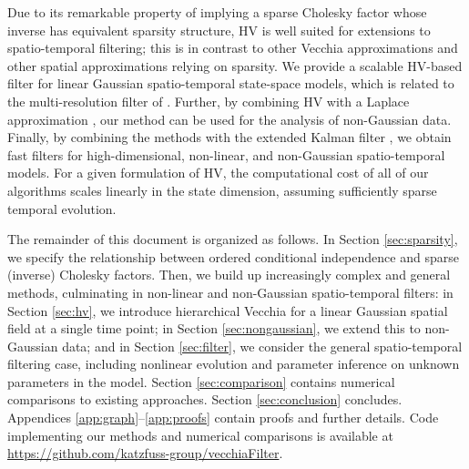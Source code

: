 \documentclass[12pt,letterpaper]{article}
\theoremstyle{propstyle}
\theoremstyle{propstyle}
\theoremstyle{propstyle}
\theoremstyle{propstyle}
\theoremstyle{propstyle}
\newcommand{\todo}[1]{\textcolor{red}{[#1]}}
\begin{document}
Due to its remarkable property of implying a sparse Cholesky factor whose inverse has equivalent sparsity structure, HV is well suited for extensions to spatio-temporal filtering; this is in contrast to other Vecchia approximations and other spatial approximations relying on sparsity. We provide a scalable HV-based filter for linear Gaussian spatio-temporal state-space models, which is related to the multi-resolution filter of \citet{Jurek2018}.
Further, by combining HV with a Laplace approximation \citep[cf.][]{Zilber2019}, our method can be used for the analysis of non-Gaussian data. Finally, by combining the methods with the extended Kalman filter \citep[e.g.,][Ch.~5]{Grewal1993}, we obtain fast filters for high-dimensional, non-linear, and non-Gaussian spatio-temporal models.
For a given formulation of HV, the computational cost of all of our algorithms scales linearly in the state dimension, assuming sufficiently sparse temporal evolution.



The remainder of this document is organized as follows. In Section \ref{sec:sparsity}, we specify the relationship between ordered conditional independence and sparse (inverse) Cholesky factors. Then, we build up increasingly complex and general methods, culminating in non-linear and non-Gaussian spatio-temporal filters: in Section \ref{sec:hv}, we introduce hierarchical Vecchia for a linear Gaussian spatial field at a single time point; in Section \ref{sec:nongaussian}, we extend this to non-Gaussian data; and in Section \ref{sec:filter}, we consider the general spatio-temporal filtering case, including nonlinear evolution and parameter inference on unknown parameters in the model. Section \ref{sec:comparison} contains numerical comparisons to existing approaches. Section \ref{sec:conclusion} concludes.
Appendices \ref{app:graph}--\ref{app:proofs} contain proofs and further details.
Code implementing our methods and numerical comparisons is available at \url{https://github.com/katzfuss-group/vecchiaFilter}.
\end{document}

